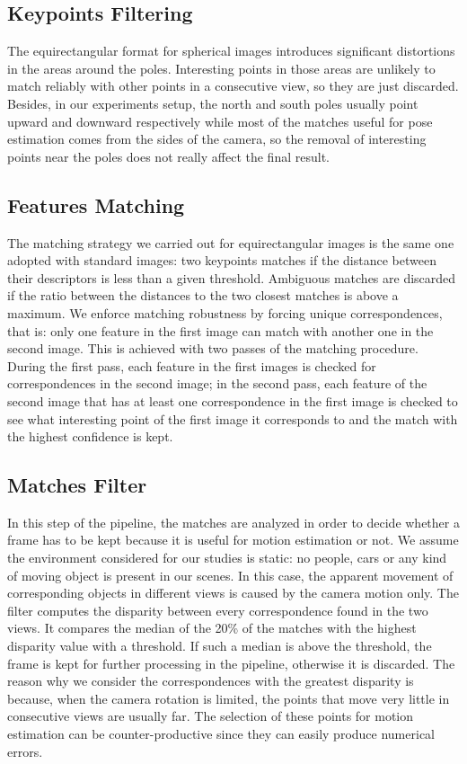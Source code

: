 \subsection{Keypoints Filtering}
The equirectangular format for spherical images introduces significant 
distortions in the areas around the poles. Interesting points in those areas 
are unlikely to match reliably with other points in a consecutive view, 
so they are just discarded.
Besides, in our experiments setup, the north and south poles usually point 
upward and downward respectively while most of the matches useful for pose 
estimation comes from the sides of the camera, so the removal of interesting 
points near the poles does not really affect the final result.

\subsection{Features Matching}
The matching strategy we carried out for equirectangular images is the same one 
adopted with standard images: two keypoints matches if the distance between 
their descriptors is less than a given threshold. Ambiguous matches 
are discarded if the ratio between the distances to the two closest matches is 
above a maximum.
We enforce matching robustness by forcing unique correspondences, that is:
only one feature in the first image can match with another one in the second
image. This is achieved with two passes of the matching procedure. During the 
first pass, each feature in the first images is checked for correspondences in
the second image; in the second pass, each feature of the second image that 
has at least one correspondence in the first image is checked to see what 
interesting point of the first image it corresponds to and the match with the
highest confidence is kept.

\subsection{Matches Filter}
In this step of the pipeline, the matches are analyzed in order to decide 
whether a frame has to be kept because it is useful for motion estimation or
not.
We assume the environment considered for our studies is static: no people, 
cars or any kind of moving object is present in our scenes. In this case, the 
apparent movement of corresponding objects in different views is caused by 
the camera motion only.
The filter computes the disparity between every correspondence found in the 
two views. It compares the median of the 20\% of the matches with the highest 
disparity value with a threshold. If such a median is above 
the threshold, the frame is kept for further processing in the pipeline, 
otherwise it is discarded.
The reason why we consider the correspondences with the greatest disparity is 
because, when the camera rotation is limited, the points that move very little 
in consecutive views are usually far. The selection of these points for motion 
estimation can be counter-productive since they can easily produce numerical 
errors. 

